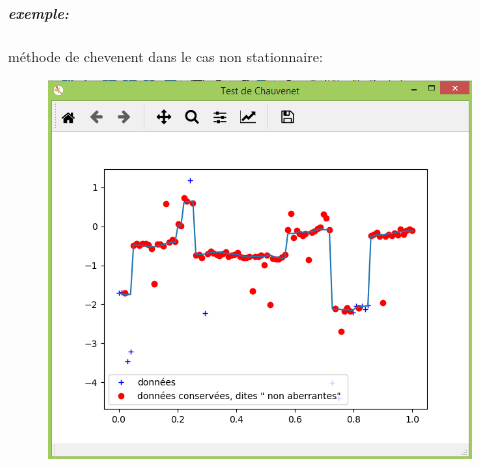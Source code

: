 \documentclass[11pt]{report}
\begin{document}
\subparagraph{exemple:}méthode de chevenent dans le cas non stationnaire:
\begin{figure}[!htb] %
 
% 
\includegraphics[width=\linewidth]{nst05.PNG} %


\end{figure}
\end{document}
